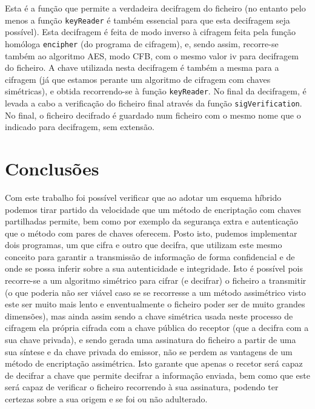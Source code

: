 \documentclass[a4paper,11pt,openright,oneside]{report}
\begin{document}
Esta é a função que permite a verdadeira decifragem do ficheiro (no entanto pelo menos a função \verb|keyReader| é também essencial para que esta decifragem seja possível). Esta decifragem é feita de modo inverso à cifragem feita pela função homóloga \verb|encipher| (do programa de cifragem), e, sendo assim, recorre-se também ao algoritmo AES, modo CFB, com o mesmo valor iv para decifragem do ficheiro. A chave utilizada nesta decifragem é também a mesma para a cifragem (já que estamos perante um algoritmo de cifragem com chaves simétricas), e obtida recorrendo-se à função \verb|keyReader|. No final da decifragem, é levada a cabo a verificação do ficheiro final através da função \verb|sigVerification|.\\

No final, o ficheiro decifrado é guardado num ficheiro com o mesmo nome que o indicado para decifragem, sem extensão.

\chapter{Conclusões}
\label{chap.conclusões}

Com este trabalho foi possível verificar que ao adotar um esquema híbrido podemos tirar partido da velocidade que um método de encriptação com chaves partilhadas permite, bem como por exemplo da segurança extra e autenticação que o método com pares de chaves oferecem. Posto isto, pudemos implementar dois programas, um que cifra e outro que decifra, que utilizam este mesmo conceito para garantir a transmissão de informação de forma confidencial e de onde se possa inferir sobre a sua autenticidade e integridade. Isto é possível pois recorre-se a um algoritmo simétrico para cifrar (e decifrar) o ficheiro a transmitir (o que poderia não ser viável caso se se recorresse a um método assimétrico visto este ser muito mais lento e enventualmente o ficheiro poder ser de muito grandes dimensões), mas ainda assim sendo a chave simétrica usada neste processo de cifragem ela própria cifrada com a chave pública do receptor (que a decifra com a sua chave privada), e sendo gerada uma assinatura do ficheiro a partir de uma sua síntese e da chave privada do emissor, não se perdem as vantagens de um método de encriptação assimétrica. Isto garante que apenas o recetor será capaz de decifrar a chave que permite decifrar a informação enviada, bem como que este será capaz de verificar o ficheiro recorrendo à sua assinatura, podendo ter certezas sobre a sua origem e se foi ou não adulterado.
\end{document}
